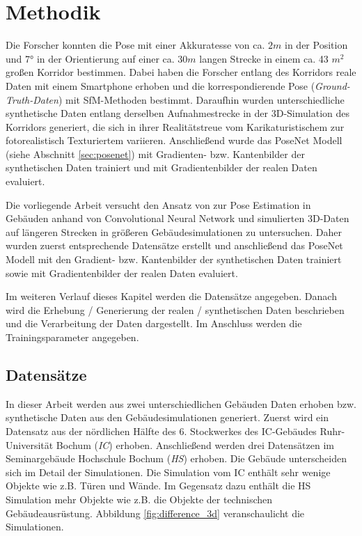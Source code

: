 
\section{Methodik}



Die Forscher \citet{acharyaBIMPoseNetIndoorCamera2019} konnten die Pose mit einer Akkuratesse von ca. $2m$ in der Position und 7° in der Orientierung auf einer ca. 30$m$ langen Strecke in einem ca. 43 $m^2$ großen Korridor bestimmen. Dabei haben die Forscher entlang des Korridors reale Daten mit einem Smartphone erhoben und die korrespondierende Pose (\textit{Ground-Truth-Daten}) mit SfM-Methoden bestimmt. Daraufhin wurden unterschiedliche synthetische Daten entlang derselben Aufnahmestrecke in der 3D-Simulation des Korridors generiert, die sich in ihrer Realitätstreue vom Karikaturistischem zur fotorealistisch Texturiertem variieren. Anschließend wurde das PoseNet Modell (siehe Abschnitt \ref{sec:posenet}) mit Gradienten- bzw. Kantenbilder der synthetischen Daten trainiert und mit Gradientenbilder der realen Daten evaluiert.



Die vorliegende Arbeit versucht den Ansatz von \citet{acharyaBIMPoseNetIndoorCamera2019} zur Pose Estimation in Gebäuden anhand von Convolutional Neural Network und simulierten 3D-Daten auf längeren Strecken in größeren Gebäudesimulationen zu untersuchen. Daher wurden zuerst entsprechende Datensätze erstellt und anschließend das PoseNet Modell mit den Gradient- bzw. Kantenbilder der synthetischen Daten trainiert sowie mit Gradientenbilder der realen Daten evaluiert.


Im weiteren Verlauf dieses Kapitel werden die Datensätze angegeben. Danach wird die Erhebung / Generierung der realen / synthetischen Daten beschrieben und die Verarbeitung der Daten dargestellt. Im Anschluss werden die Trainingsparameter angegeben. 



\subsection{Datensätze}
\label{subsec:datasets}
In dieser Arbeit werden aus zwei unterschiedlichen Gebäuden Daten erhoben bzw. synthetische Daten aus den Gebäudesimulationen generiert. 
Zuerst wird ein Datensatz aus der nördlichen Hälfte des 6. Stockwerkes des IC-Gebäudes Ruhr-Universität Bochum (\textit{IC}) erhoben. Anschließend werden drei Datensätzen im Seminargebäude Hochschule Bochum (\textit{HS}) erhoben. Die Gebäude unterscheiden sich im Detail der Simulationen. Die Simulation vom IC enthält sehr wenige Objekte wie z.B. Türen und Wände. Im Gegensatz dazu enthält die HS Simulation mehr Objekte wie z.B. die Objekte der technischen Gebäudeausrüstung. Abbildung \ref{fig:difference_3d} veranschaulicht die Simulationen.


